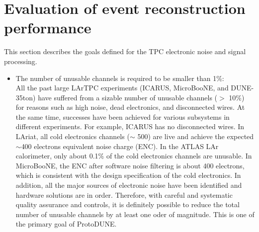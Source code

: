 \section{Evaluation of event reconstruction performance}


This section describes the goals defined for the TPC electronic noise and signal processing.
\begin{itemize}
\item The number of unusable channels is required to be smaller than 1\%: \\
All the past large LArTPC experiments (ICARUS, MicroBooNE, and DUNE-35ton) have suffered from a sizable
number of unusable channels ($>$ 10\%) for %
reasons such as high noise, dead electronics, 
and disconnected wires. At the same time, successes have been achieved for various subsystems in 
different experiments. 
For example, ICARUS has no disconnected wires. In LAriat, all 
cold electronics channels ($\sim$ 500) are live and achieve the expected $\sim$400 electrons equivalent 
noise charge (ENC). In the ATLAS LAr calorimeter, only about 0.1\% of the cold electronics channels are unusable. 
In MicroBooNE, the ENC after software noise filtering is about 400 electrons, which is consistent with 
the design specification of the cold electronics. In addition, all the major sources of electronic noise
have been identified and hardware solutions are in order. Therefore, with careful and systematic 
quality assurance and controls, it is definitely possible to reduce the total number of unusable channels
by at least one oder of magnitude. This is one of the primary goal of ProtoDUNE.



\end{itemize}
